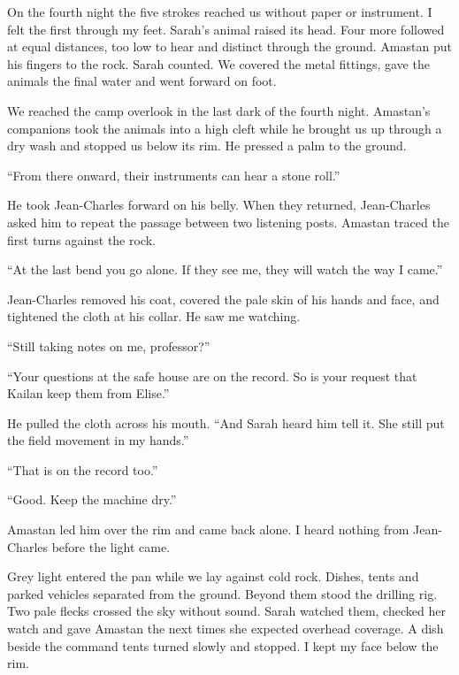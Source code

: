 On the fourth night the five strokes reached us without paper or instrument. I felt the first through my feet. Sarah's animal raised its head. Four more followed at equal distances, too low to hear and distinct through the ground. Amastan put his fingers to the rock. Sarah counted. We covered the metal fittings, gave the animals the final water and went forward on foot.\par

\ornament

We reached the camp overlook in the last dark of the fourth night. Amastan's companions took the animals into a high cleft while he brought us up through a dry wash and stopped us below its rim. He pressed a palm to the ground.\par

``From there onward, their instruments can hear a stone roll.''\par

He took Jean-Charles forward on his belly. When they returned, Jean-Charles asked him to repeat the passage between two listening posts. Amastan traced the first turns against the rock.\par

``At the last bend you go alone. If they see me, they will watch the way I came.''\par

Jean-Charles removed his coat, covered the pale skin of his hands and face, and tightened the cloth at his collar. He saw me watching.\par

``Still taking notes on me, professor?''\par

``Your questions at the safe house are on the record. So is your request that Kailan keep them from Elise.''\par

He pulled the cloth across his mouth. ``And Sarah heard him tell it. She still put the field movement in my hands.''\par

``That is on the record too.''\par

``Good. Keep the machine dry.''\par

Amastan led him over the rim and came back alone. I heard nothing from Jean-Charles before the light came.\par

Grey light entered the pan while we lay against cold rock. Dishes, tents and parked vehicles separated from the ground. Beyond them stood the drilling rig. Two pale flecks crossed the sky without sound. Sarah watched them, checked her watch and gave Amastan the next times she expected overhead coverage. A dish beside the command tents turned slowly and stopped. I kept my face below the rim.\par

